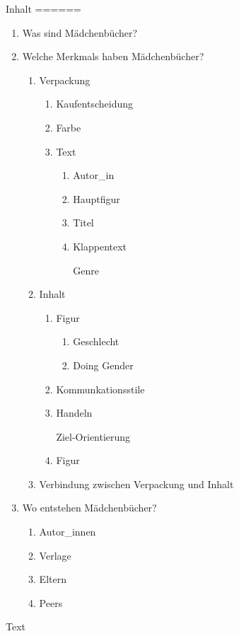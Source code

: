 \documentclass[]{article}
\author{}
\date{}
\begin{document}
Inhalt ======

\begin{enumerate}[<+->][1.]
\item
  Was sind Mädchenbücher?
\item
  Welche Merkmals haben Mädchenbücher?

  \begin{enumerate}[<+->][1.]
  \item
    Verpackung

    \begin{enumerate}[<+->][1.]
    \item
      Kaufentscheidung
    \item
      Farbe
    \item
      Text

      \begin{enumerate}[<+->][1.]
      \item
        Autor\_in
      \item
        Hauptfigur
      \item
        Titel
      \item
        Klappentext

        Genre
      \end{enumerate}
    \end{enumerate}
  \item
    Inhalt

    \begin{enumerate}[<+->][1.]
    \item
      Figur

      \begin{enumerate}[<+->][1.]
      \item
        Geschlecht
      \item
        Doing Gender
      \end{enumerate}
    \item
      Kommunkationsstile
    \item
      Handeln

      Ziel-Orientierung
    \item
      Figur
    \end{enumerate}
  \item
    Verbindung zwischen Verpackung und Inhalt
  \end{enumerate}
\item
  Wo entstehen Mädchenbücher?

  \begin{enumerate}[<+->][1.]
  \item
    Autor\_innen
  \item
    Verlage
  \item
    Eltern
  \item
    Peers
  \end{enumerate}
\end{enumerate}

Text
\end{document}
